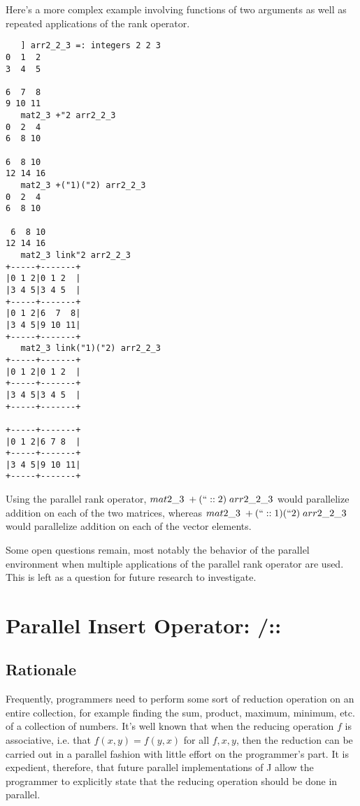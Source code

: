 Here's a more complex example involving functions of two arguments 
as well as repeated applications of the rank operator.

\begin{singlespacing}
\begin{small}
\begin{verbatim}
   ] arr2_2_3 =: integers 2 2 3
0  1  2
3  4  5

6  7  8
9 10 11
   mat2_3 +"2 arr2_2_3
0  2  4
6  8 10

6  8 10
12 14 16
   mat2_3 +("1)("2) arr2_2_3
0  2  4
6  8 10

 6  8 10
12 14 16
   mat2_3 link"2 arr2_2_3
+-----+-------+
|0 1 2|0 1 2  |
|3 4 5|3 4 5  |
+-----+-------+
|0 1 2|6  7  8|
|3 4 5|9 10 11|
+-----+-------+
   mat2_3 link("1)("2) arr2_2_3
+-----+-------+
|0 1 2|0 1 2  |
+-----+-------+
|3 4 5|3 4 5  |
+-----+-------+

+-----+-------+
|0 1 2|6 7 8  |
+-----+-------+
|3 4 5|9 10 11|
+-----+-------+
\end{verbatim}
\end{small}
\end{singlespacing}


Using the parallel rank operator, 
$mat2\_3\;+(``::2)\;arr2\_2\_3$ would parallelize addition on each of the two matrices, whereas
$mat2\_3\;+(``::1)(``2)\;arr2\_2\_3$ would parallelize addition on each of the vector elements.

Some open questions remain, most notably 
the behavior of the parallel environment when multiple applications of the parallel rank operator are used. 
This is left as a question for future research to investigate.

\section{Parallel Insert Operator: \ttfamily /:: \normalfont}
\label{pins}
\subsection{Rationale}
Frequently, programmers need to perform some sort of reduction operation on an entire collection, 
for example finding the sum, product, maximum, minimum, etc. of a collection of numbers.
It's well known that when the reducing operation $f$ is associative, i.e. that $f(x,y) = f(y,x)$ for all $f, x, y$, 
then the reduction can be carried out in a parallel fashion with little effort on the programmer's part.
It is expedient, therefore, that future parallel implementations of J allow the programmer 
to explicitly state that the reducing operation should be done in parallel.

